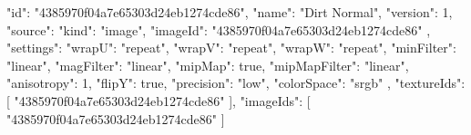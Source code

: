 {
  "id": "4385970f04a7e65303d24eb1274cde86",
  "name": "Dirt Normal",
  "version": 1,
  "source": {
    "kind": "image",
    "imageId": "4385970f04a7e65303d24eb1274cde86"
  },
  "settings": {
    "wrapU": "repeat",
    "wrapV": "repeat",
    "wrapW": "repeat",
    "minFilter": "linear",
    "magFilter": "linear",
    "mipMap": true,
    "mipMapFilter": "linear",
    "anisotropy": 1,
    "flipY": true,
    "precision": "low",
    "colorSpace": "srgb"
  },
  "textureIds": [
    "4385970f04a7e65303d24eb1274cde86"
  ],
  "imageIds": [
    "4385970f04a7e65303d24eb1274cde86"
  ]
}
